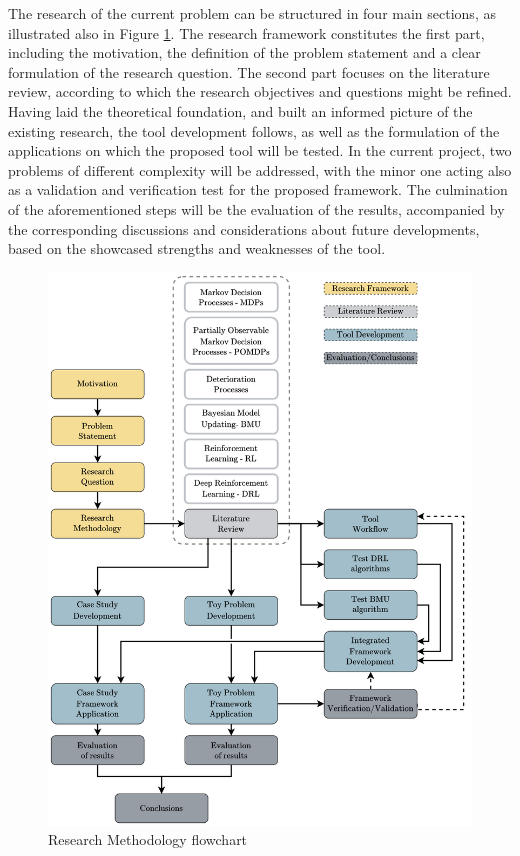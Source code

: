 The research of the current problem can be structured in four main sections, as illustrated also in Figure \ref{researchMeth}. The research framework constitutes the first part, including the motivation, the definition of the problem statement and a clear formulation of the research question. The second part focuses on the literature review, according to which the research objectives and questions might be refined. Having laid the theoretical foundation, and built an informed picture of the existing research, the tool development follows, as well as the formulation of the applications on which the proposed tool will be tested. In the current project, two problems of different complexity will be addressed, with the minor one acting also as a validation and verification test for the proposed framework. The culmination of the aforementioned steps will be the evaluation of the results, accompanied by the corresponding discussions and considerations about future developments, based on the showcased strengths and weaknesses of the tool.


\begin{figure}[H]
    \centering
	\includegraphics[width=0.97\linewidth]{Figures/researchMethodology.png}
	\caption{Research Methodology flowchart}
	\label{researchMeth}
\end{figure}

